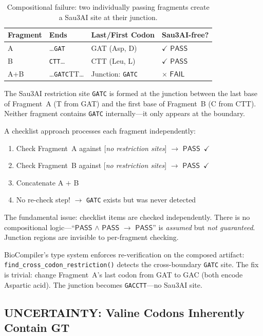 \documentclass[runningheads]{llncs}
\newcommand{\PASS}{\ensuremath{\mathsf{PASS}}\xspace}
\newcommand{\FAIL}{\ensuremath{\mathsf{FAIL}}\xspace}
\begin{document}
\begin{table}[t]
\centering
\caption{Compositional failure: two individually passing fragments
         create a Sau3AI site at their junction.}
\label{tab:junction}
\begin{tabular}{llll}
\toprule
\textbf{Fragment} & \textbf{Ends} & \textbf{Last/First Codon} &
  \textbf{Sau3AI-free?} \\
\midrule
A & \dots\texttt{GAT} & GAT (Asp, D) & $\checkmark$ \PASS \\
B & \texttt{CTT}\dots & CTT (Leu, L) & $\checkmark$ \PASS \\
A+B & \dots\texttt{GATC}TT\dots & Junction: \texttt{GATC} &
  $\times$ \FAIL \\
\bottomrule
\end{tabular}
\end{table}

The Sau3AI restriction site \texttt{GATC} is formed at the junction
between the last base of Fragment~A (T from GAT) and the first base of
Fragment~B (C from CTT). Neither fragment contains \texttt{GATC}
internally---it only appears at the boundary.

A checklist approach processes each fragment independently:
\begin{enumerate}[leftmargin=*,itemsep=0pt,topsep=1pt]
\item Check Fragment~A against [\emph{no restriction sites}]
      $\to$ \PASS~$\checkmark$
\item Check Fragment~B against [\emph{no restriction sites}]
      $\to$ \PASS~$\checkmark$
\item Concatenate A $+$ B
\item No re-check step! $\to$ \texttt{GATC} exists but was never
      detected
\end{enumerate}

The fundamental issue: checklist items are checked independently.
There is no compositional logic---``\PASS{} $\wedge$ \PASS{}
$\to$ \PASS'' is \emph{assumed} but \emph{not guaranteed}.
Junction regions are invisible to per-fragment checking.

BioCompiler's type system enforces re-verification on the composed
artifact: \texttt{find\_cross\_codon\_restriction()} detects the
cross-boundary \texttt{GATC} site.
The fix is trivial: change Fragment~A's last codon from GAT to GAC
(both encode Aspartic acid).
The junction becomes \texttt{GACCTT}---no Sau3AI site.

\subsection{UNCERTAINTY: Valine Codons Inherently Contain GT}
\end{document}

